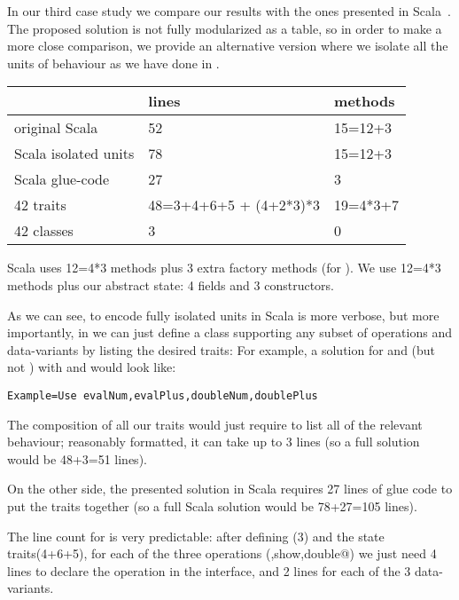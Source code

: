 In our third case study we compare our results with the ones presented
in Scala~\cite{Zenger-Odersky2005}.
The proposed solution is not fully modularized as a table,
so in order to make a more close comparison, we provide an alternative
version where we isolate all the units of behaviour as we
have done in \name.
\begin{minipage}{0.6\textwidth}
\begin{tabular}{l |l |l}
&                              lines  &   methods\\
\hline
original Scala~\cite{Zenger-Odersky2005}          & 52     &  15=12+3\\
Scala  isolated units   & 78    &  15=12+3\\
Scala  glue-code        & 27   &     3\\
42 traits               & 48=3+4+6+5 + (4+2*3)*3   &    19=4*3+7\\
42 classes              &   3    &     0\\
\end{tabular}
\end{minipage}
\begin{minipage}{0.4\textwidth}
Scala uses 12=4*3 methods plus 3 extra factory methods (for \Q@double@).
We use 12=4*3 methods plus our abstract state: 4 fields and 3 constructors.
\end{minipage}

As we can see, to encode fully isolated units in Scala is
more verbose,
but more importantly,
in \name we can just define a class supporting any subset of operations
and data-variants by listing the desired traits:
For example, a solution for \Q@Num@ and \Q@Plus@ (but not \Q@Neg@)
with \Q@eval@ and \Q@double@ would look like:
\begin{lstlisting}
Example=Use evalNum,evalPlus,doubleNum,doublePlus
\end{lstlisting}
The composition of all our traits would just require to list all
of the relevant behaviour; reasonably formatted, it can take up to 3 lines (so a full \name solution would be 48+3=51 lines).

On the other side, the presented solution in Scala requires
27 lines of glue code to put the traits together
(so a full Scala solution would be 78+27=105 lines).

The line count for \name is very predictable: after defining \Q@exp@ (3) and the state traits(4+6+5),
for each of the three operations (\Q@eval,show,double@) 
we just need 4 lines to declare the operation 
in the interface, and 2 lines for each of the 3 data-variants.

